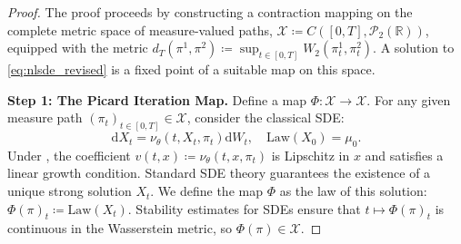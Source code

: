 \documentclass[qian]{imsart}
\newcommand{\R}{\mathbb{R}}
\newcommand{\Pcal}{\mathcal{P}}
\newcommand{\dd}{\mathrm{d}}
\theoremstyle{plain}
\theoremstyle{definition}
\begin{document}
\begin{proof}
The proof proceeds by constructing a contraction mapping on the complete metric space of measure-valued paths, $\mathcal{X} \coloneqq C([0,T], \Pcal_2(\R))$, equipped with the metric $d_T(\pi^1, \pi^2) \coloneqq \sup_{t\in[0,T]} W_2(\pi^1_t, \pi^2_t)$. A solution to \eqref{eq:nlsde_revised} is a fixed point of a suitable map on this space.

\textbf{Step 1: The Picard Iteration Map.}
Define a map $\Phi: \mathcal{X} \to \mathcal{X}$. For any given measure path $(\pi_t)_{t \in [0,T]} \in \mathcal{X}$, consider the classical SDE:
\[ \dd X_t = \nu_\theta(t, X_t, \pi_t) \dd W_t, \quad \mathrm{Law}(X_0) = \mu_0. \]
Under , the coefficient $v(t,x) \coloneqq \nu_\theta(t,x,\pi_t)$ is Lipschitz in $x$ and satisfies a linear growth condition. Standard SDE theory guarantees the existence of a unique strong solution $X_t$. We define the map $\Phi$ as the law of this solution: $\Phi(\pi)_t \coloneqq \mathrm{Law}(X_t)$. Stability estimates for SDEs ensure that $t \mapsto \Phi(\pi)_t$ is continuous in the Wasserstein metric, so $\Phi(\pi) \in \mathcal{X}$.


\end{proof}
\end{document}
